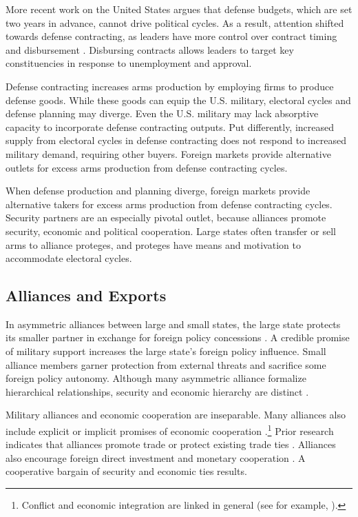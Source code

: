 \documentclass[12pt]{article}
\begin{document}
More recent work on the United States argues that defense budgets, which are set two years in advance, cannot drive political cycles.
As a result, attention shifted towards defense contracting, as leaders have more control over contract timing and disbursement \citep{Mayer1995, DerouenHeo2000}.
Disbursing contracts allows leaders to target key constituencies in response to unemployment and approval.


Defense contracting increases arms production by employing firms to produce defense goods. 
While these goods can equip the U.S. military, electoral cycles and defense planning may diverge.
Even the U.S. military may lack absorptive capacity to incorporate defense contracting outputs.
Put differently, increased supply from electoral cycles in defense contracting does not respond to increased military demand, requiring other buyers. 
Foreign markets provide alternative outlets for excess arms production from defense contracting cycles. 


When defense production and planning diverge, foreign markets provide alternative takers for excess arms production from defense contracting cycles. 
Security partners are an especially pivotal outlet, because alliances promote security, economic and political cooperation.
Large states often transfer or sell arms to alliance proteges, and proteges have means and motivation to accommodate electoral cycles. 



\subsection{Alliances and Exports}


In asymmetric alliances between large and small states, the large state protects its smaller partner in exchange for foreign policy concessions \citep{Morrow1991}.
A credible promise of military support increases the large state's foreign policy influence. 
Small alliance members garner protection from external threats and sacrifice some foreign policy autonomy. 
Although many asymmetric alliance formalize hierarchical relationships, security and economic hierarchy are distinct \citep{Lake2009}. 


Military alliances and economic cooperation are inseparable.
Many alliances also include explicit or implicit promises of economic cooperation \citep{GowaMansfield2004, LongLeeds2006, Davis2008, Poast2012}.\footnote{Conflict and economic integration are linked in general (see for example, \citep{GartzkeLi2003, Chen2021}).}
Prior research indicates that alliances promote trade \citep{Gowa1995, GowaMansfield2004, Haim2016} or protect existing trade ties \citep{Fordham2010}.
Alliances also encourage foreign direct investment \citep{LiVashchilko2010} and monetary cooperation \citep{Li2003}.
A cooperative bargain of security and economic ties results. 
\end{document}
